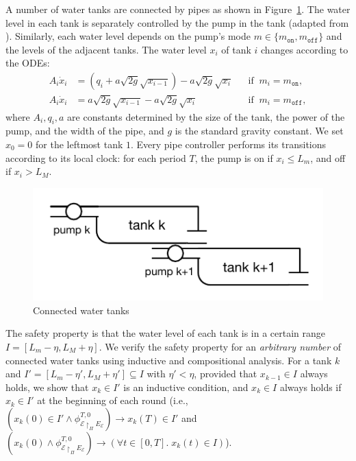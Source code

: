 A number of water tanks are connected by pipes as shown in Figure~\ref{fig:water}.
The water level in each tank is separately controlled by the pump in the tank
(adapted from \cite{kowalewski1999case,raisch1999approximating}).
Similarly, each water level depends on the pump's mode $m \in \{m_\texttt{on}, m_\texttt{off}\}$
and the levels of the adjacent tanks.
The water level $x_i$ of tank $i$ changes according to the ODEs:
\[
\begin{aligned}
A_i \dot{x}_i &=  (q_i + a \sqrt{2g} \sqrt{x_{i-1}})  - a \sqrt{2g} \sqrt{x_i}
&& \mbox{if}\;\; m_i = m_\texttt{on},
\\
A_i \dot{x}_i &= a \sqrt{2g} \sqrt{x_{i-1}}  - a \sqrt{2g} \sqrt{x_i}
&& \mbox{if}\;\; m_i = m_\texttt{off},
\end{aligned}
\]
where $A_i, q_i, a $ are constants determined by the size of the tank, the power of the pump, 
and the width of the pipe,
and $g$ is the standard gravity constant. We set $x_0 = 0$ for the leftmost tank $1$.
%
Every pipe controller performs its transitions according to its local clock:
for each period $T$, 
the pump is on if $x_i \leq L_m$, and off if $x_i > L_M$.

\begin{figure}
\centering
\includegraphics[clip=true,trim=0.3cm 0.35cm 0.3cm 0.35cm,width=0.6\columnwidth]{water.pdf}    
\caption{Connected water tanks}  \label{fig:water}
\end{figure}

The safety property is that the water level of each tank is in a certain range
$I = [L_m - \eta, L_M + \eta]$.
%
We verify the safety property for an \emph{arbitrary number} of connected water tanks 
using inductive and compositional analysis.
For a tank $k$ and %
$I' = [L_m - \eta', L_M + \eta']\subseteq I$ with $\eta' < \eta$,
provided  that $x_{k-1} \in I$ always holds, %
we show that $x_{k} \in I'$ is an inductive condition,
and  $x_{k} \in I$ always holds
if $x_{k} \in I'$ at the beginning of each round
(i.e., $(x_k(0) \in I' \wedge \phi_{\mathcal{E} \restriction_{\Pi} E_\mathcal{E}}^{T,0}) \rightarrow x_k(T) \in I'$
and $(x_{k}(0) \wedge \phi_{\mathcal{E} \restriction_{\Pi} E_\mathcal{E}}^{T,0}) \rightarrow (\forall t \in [0,T].\; x_{k}(t) \in I)$).



